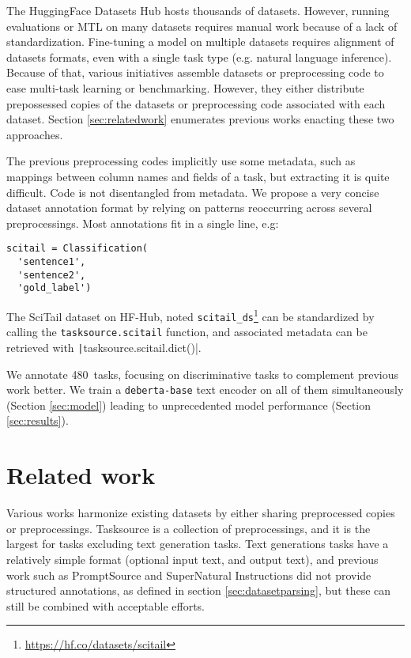 \documentclass[11pt]{article}
\newcommand\N{480}
\begin{document}
The HuggingFace Datasets \citep{2020HuggingFace-datasets} Hub hosts thousands of datasets. However, running evaluations or MTL on many datasets requires manual work because of a lack of standardization. Fine-tuning a model on multiple datasets requires alignment of datasets formats, even with a single task type (e.g. natural language inference). Because of that, various initiatives assemble datasets or preprocessing code to ease multi-task learning or benchmarking. However, they either distribute prepossessed copies of the datasets or preprocessing code associated with each dataset. Section \ref{sec:relatedwork} enumerates previous works enacting these two approaches.

The previous preprocessing codes implicitly use some metadata, such as mappings between column names and fields of a task, but extracting it is quite difficult. Code is not disentangled from metadata.
We propose a very concise dataset annotation format by relying on patterns reoccurring across several preprocessings. Most annotations fit in a single line, e.g:
\begin{verbatim}
scitail = Classification(
  'sentence1',
  'sentence2',
  'gold_label')
\end{verbatim} 
The SciTail \citep{scitail} dataset on HF-Hub, noted \texttt{scitail\_ds}\footnote{\url{https://hf.co/datasets/scitail}} \citep{scitail} can be standardized by calling the \texttt{tasksource.scitail} function, and associated metadata can be retrieved with \texttt|tasksource.scitail.dict()|.

We annotate \N\ tasks, focusing on discriminative tasks to complement previous work better. We train a \texttt{deberta-base} text encoder on all of them simultaneously (Section \ref{sec:model}) leading to unprecedented model performance (Section \ref{sec:results}).

\section{Related work \label{sec:relatedwork}}
Various works harmonize existing datasets by either sharing preprocessed copies or preprocessings. Tasksource is a collection of preprocessings, and it is the largest for tasks excluding text generation tasks.
Text generations tasks have a relatively simple format (optional input text, and output text), and previous work such as  PromptSource \citep{bach2022promptsource} and SuperNatural Instructions\cite{supernaturalinstructions} did not provide structured annotations, as defined in section \ref{sec:datasetparsing}, but these can still be combined with acceptable efforts. 
\end{document}
